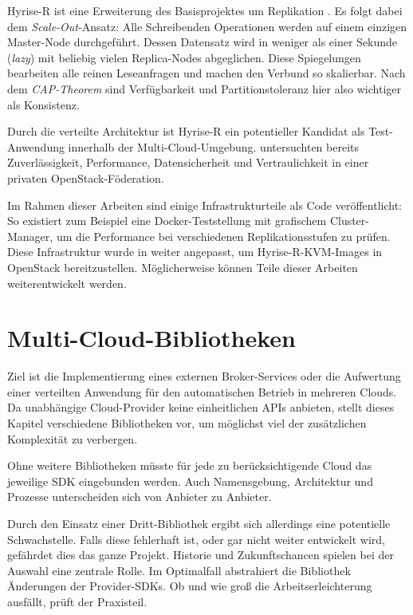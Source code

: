Hyrise-R ist eine Erweiterung des Basisprojektes um Replikation \cite{schwalb:2015:hyrise-r}. Es folgt dabei dem \emph{Scale-Out}-Ansatz: Alle Schreibenden Operationen werden auf einem einzigen Master-Node durchgeführt. Dessen Datensatz wird in weniger als einer Sekunde (\emph{lazy}) mit beliebig vielen Replica-Nodes abgeglichen. Diese Spiegelungen bearbeiten alle reinen Leseanfragen und machen den Verbund so skalierbar. Nach dem \emph{CAP-Theorem} sind Verfügbarkeit und Partitionstoleranz hier also wichtiger als Konsistenz.

Durch die verteilte Architektur ist Hyrise-R ein potentieller Kandidat als Test-Anwendung innerhalb der Multi-Cloud-Umgebung. \cite{ssiclops:d23:security-extensions, ssiclops:d42:experiments-measurements, bastian:2017:openstack-policies} untersuchten bereits Zuverlässigkeit, Performance, Datensicherheit und Vertraulichkeit in einer privaten OpenStack-Föderation. 

Im Rahmen dieser Arbeiten sind einige Infrastrukturteile als Code veröffentlicht: So existiert zum Beispiel eine Docker-Teststellung mit grafischem Cluster-Manager, um die Performance bei verschiedenen Replikationsstufen zu prüfen. Diese Infrastruktur wurde in \cite{eschrig:2016:ssiclops-masterproject, maschler:2017:ssiclops-masterproject} weiter angepasst, um Hyrise-R-KVM-Images in OpenStack bereitzustellen. Möglicherweise können Teile dieser Arbeiten weiterentwickelt werden.


\section{Multi-Cloud-Bibliotheken}
\label{sec:bibliotheken}

Ziel ist die Implementierung eines externen Broker-Services oder die Aufwertung einer verteilten Anwendung für den automatischen Betrieb in mehreren Clouds. Da unabhängige Cloud-Provider keine einheitlichen APIs anbieten, stellt dieses Kapitel verschiedene Bibliotheken vor, um möglichst viel der zusätzlichen Komplexität zu verbergen.

Ohne weitere Bibliotheken müsste für jede zu berücksichtigende Cloud das jeweilige SDK eingebunden werden. Auch Namensgebung, Architektur und Prozesse unterscheiden sich von Anbieter zu Anbieter. 

Durch den Einsatz einer Dritt-Bibliothek ergibt sich allerdings eine potentielle Schwachstelle. Falls diese fehlerhaft ist, oder gar nicht weiter entwickelt wird, gefährdet dies das ganze Projekt. Historie und Zukunftschancen spielen bei der Auswahl eine zentrale Rolle. Im Optimalfall abstrahiert die Bibliothek Änderungen der Provider-SDKs. Ob und wie groß die Arbeitserleichterung ausfällt, prüft der Praxisteil.

